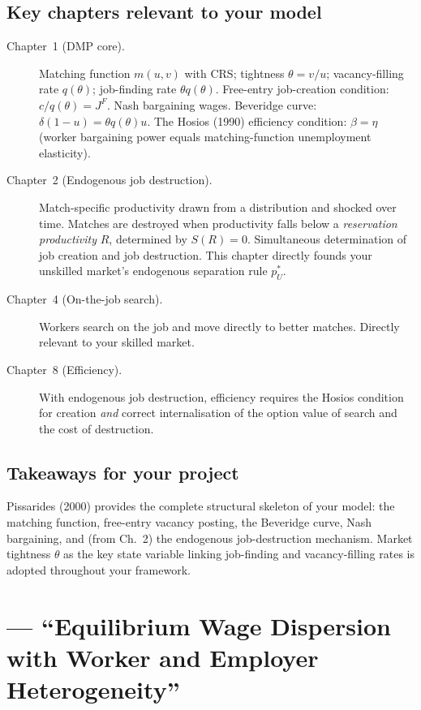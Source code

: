 \documentclass[12pt]{article}
\begin{document}
\subsection*{Key chapters relevant to your model}

\begin{description}
    \item[Chapter~1 (DMP core).] Matching function $m(u,v)$ with CRS; tightness $\theta = v/u$; vacancy-filling rate $q(\theta)$; job-finding rate $\theta q(\theta)$. Free-entry job-creation condition: $c/q(\theta) = J^F$. Nash bargaining wages. Beveridge curve: $\delta(1-u) = \theta q(\theta) u$. The Hosios (1990) efficiency condition: $\beta = \eta$ (worker bargaining power equals matching-function unemployment elasticity).

    \item[Chapter~2 (Endogenous job destruction).] Match-specific productivity drawn from a distribution and shocked over time. Matches are destroyed when productivity falls below a \emph{reservation productivity} $R$, determined by $S(R) = 0$. Simultaneous determination of job creation and job destruction. This chapter directly founds your unskilled market's endogenous separation rule $p_U^*$.

    \item[Chapter~4 (On-the-job search).] Workers search on the job and move directly to better matches. Directly relevant to your skilled market.

    \item[Chapter~8 (Efficiency).] With endogenous job destruction, efficiency requires the Hosios condition for creation \emph{and} correct internalisation of the option value of search and the cost of destruction.
\end{description}

\subsection*{Takeaways for your project}

Pissarides (2000) provides the complete structural skeleton of your model: the matching function, free-entry vacancy posting, the Beveridge curve, Nash bargaining, and (from Ch.~2) the endogenous job-destruction mechanism. Market tightness $\theta$ as the key state variable linking job-finding and vacancy-filling rates is adopted throughout your framework.


\section{\citet{postelvinary2002} --- ``Equilibrium Wage Dispersion with Worker and Employer Heterogeneity''}
\end{document}
